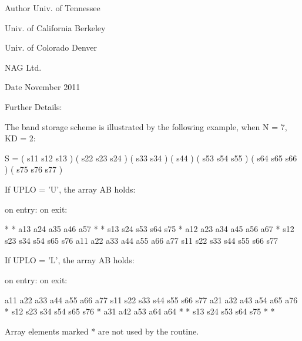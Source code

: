 \begin{DoxyAuthor}{Author}
Univ. of Tennessee 

Univ. of California Berkeley 

Univ. of Colorado Denver 

N\+A\+G Ltd. 
\end{DoxyAuthor}
\begin{DoxyDate}{Date}
November 2011 
\end{DoxyDate}
\begin{DoxyParagraph}{Further Details\+: }
\begin{DoxyVerb}  The band storage scheme is illustrated by the following example, when
  N = 7, KD = 2:

  S = ( s11  s12  s13                     )
      (      s22  s23  s24                )
      (           s33  s34                )
      (                s44                )
      (           s53  s54  s55           )
      (                s64  s65  s66      )
      (                     s75  s76  s77 )

  If UPLO = 'U', the array AB holds:

  on entry:                          on exit:

   *    *   a13  a24  a35  a46  a57   *    *   s13  s24  s53  s64  s75
   *   a12  a23  a34  a45  a56  a67   *   s12  s23  s34  s54  s65  s76
  a11  a22  a33  a44  a55  a66  a77  s11  s22  s33  s44  s55  s66  s77

  If UPLO = 'L', the array AB holds:

  on entry:                          on exit:

  a11  a22  a33  a44  a55  a66  a77  s11  s22  s33  s44  s55  s66  s77
  a21  a32  a43  a54  a65  a76   *   s12  s23  s34  s54  s65  s76   *
  a31  a42  a53  a64  a64   *    *   s13  s24  s53  s64  s75   *    *

  Array elements marked * are not used by the routine.\end{DoxyVerb}
 
\end{DoxyParagraph}
